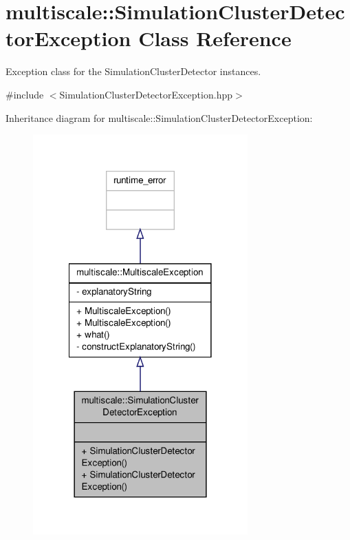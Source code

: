 \hypertarget{classmultiscale_1_1SimulationClusterDetectorException}{\section{multiscale\-:\-:Simulation\-Cluster\-Detector\-Exception Class Reference}
\label{classmultiscale_1_1SimulationClusterDetectorException}
}


Exception class for the Simulation\-Cluster\-Detector instances.  




{\ttfamily \#include $<$Simulation\-Cluster\-Detector\-Exception.\-hpp$>$}



Inheritance diagram for multiscale\-:\-:Simulation\-Cluster\-Detector\-Exception\-:
\nopagebreak
\begin{figure}[H]
\begin{center}
\leavevmode
\includegraphics[width=234pt]{classmultiscale_1_1SimulationClusterDetectorException__inherit__graph}
\end{center}
\end{figure}


